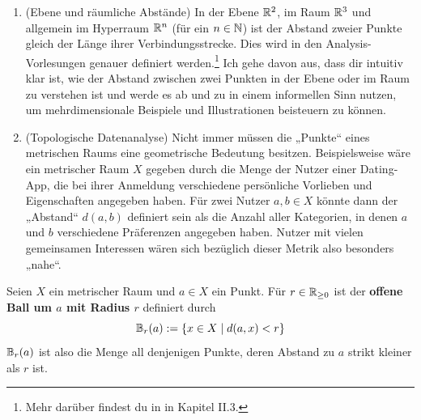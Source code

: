 \begin{bsp} \quad
    \begin{enumerate}
        \item(Ebene und räumliche Abstände) In der Ebene $\mathbb R^2$, im Raum $\mathbb R^3$ und allgemein im Hyperraum $\mathbb R^n$ (für ein $n\in \mathbb N$) ist der Abstand zweier Punkte gleich der Länge ihrer Verbindungsstrecke. Dies wird in den Analysis-Vorlesungen genauer definiert werden.\footnote{Mehr darüber findest du in \cite{AE06} in Kapitel II.3.} Ich gehe davon aus, dass dir intuitiv klar ist, wie der Abstand zwischen zwei Punkten in der Ebene oder im Raum zu verstehen ist und werde es ab und zu in einem informellen Sinn nutzen, um mehrdimensionale Beispiele und Illustrationen beisteuern zu können.
        \item(Topologische Datenanalyse) Nicht immer müssen die „Punkte“ eines metrischen Raums eine geometrische Bedeutung besitzen. Beispielsweise wäre ein metrischer Raum $X$ gegeben durch die Menge der Nutzer einer Dating-App, die bei ihrer Anmeldung verschiedene persönliche Vorlieben und Eigenschaften angegeben haben. Für zwei Nutzer $a,b\in X$ könnte dann der „Abstand“ $d(a,b)$ definiert sein als die Anzahl aller Kategorien, in denen $a$ und $b$ verschiedene Präferenzen angegeben haben. Nutzer mit vielen gemeinsamen Interessen wären sich bezüglich dieser Metrik also besonders „nahe“.
    \end{enumerate}
\end{bsp}


\begin{de} \label{def:ball} 
    Seien $X$ ein metrischer Raum und $a\in X$ ein Punkt. Für $r\in \mathbb R_{\ge 0}$ ist der \textbf{offene Ball um $a$ mit Radius $r$} definiert durch
        \[ \mathbb B_r(a) := \{ x\in X \mid d(a,x)< r\} \]
    $\mathbb B_r(a)$ ist also die Menge all denjenigen Punkte, deren Abstand zu $a$ strikt kleiner als $r$ ist.
\end{de}


